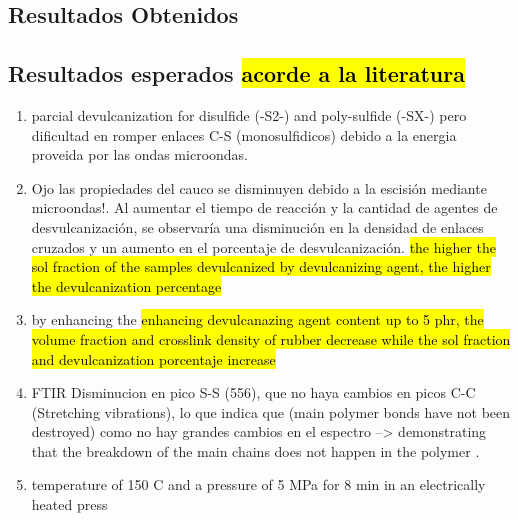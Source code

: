 \subsection{Resultados Obtenidos}

\subsection{Resultados esperados \hl{acorde a la literatura}}

\begin{enumerate}
    \item parcial devulcanization for disulfide (-S2-) and poly-sulfide (-SX-) pero dificultad en romper enlaces C-S (monosulfidicos) debido a la energia proveida por las ondas microondas.
  

    \item Ojo las propiedades del cauco se disminuyen debido a la escisión mediante microondas!.
    Al aumentar el tiempo de reacción y la cantidad de agentes de desvulcanización, se observaría una disminución en la densidad de enlaces cruzados y un aumento en el porcentaje de desvulcanización. \hl{the higher the sol fraction of the samples
devulcanized by devulcanizing agent, the higher the devulcanization percentage}



\item by enhancing the \hl{enhancing devulcanazing agent content up to 5 phr, the volume fraction and crosslink density of rubber decrease while the sol fraction and devulcanization porcentaje increase}

\item FTIR
Disminucion en pico S-S (556), que no haya cambios en picos C-C (Stretching vibrations), lo que indica que (main polymer bonds have not been destroyed) como no hay grandes cambios en el espectro --> demonstrating that the breakdown of the main chains does not happen in
the polymer \cite{Zhang2024AnDevulcanization}.

\item temperature of 150 C and a pressure of 5 MPa for 8 min
in an electrically heated press

\end{enumerate}
